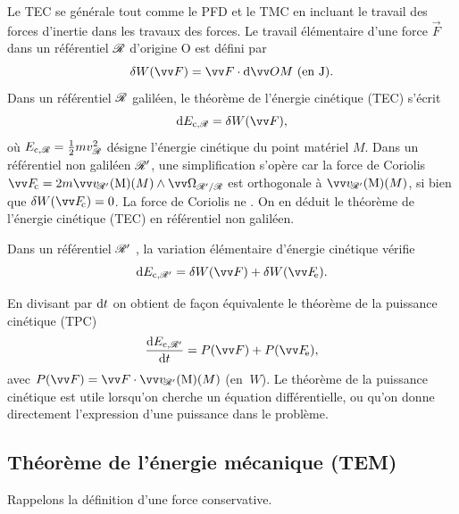 \documentclass[12pt,fancy]{cours}
\begin{document}
Le TEC se générale tout comme le PFD et le TMC en incluant le travail des forces d'inertie dans les travaux des forces. Le travail élémentaire d'une force $\Vec{F}$ dans un référentiel $\mathcal{R}$ d'origine O est défini par
\begin{equation}
  \delta W(\F) = \F \cdot \d \Vec{OM}~\text{(en J)}.
\end{equation}
Dans un référentiel $\mathcal{R}$ galiléen, le théorème de l'énergie cinétique (TEC) s'écrit
\begin{equation}
  \d E_{\rm c, \Rcal} = \delta W(\F),
\end{equation}
où $E_{\rm c, \mathcal{R}} = \frac{1}{2} m v_{\mathcal{R}}^2$ désigne l'énergie cinétique du point matériel $M$. Dans un référentiel non galiléen $\mathcal{R}'$, une simplification s'opère car la force de Coriolis $\Fc = 2m \vRp(M) \pv \OR$ est orthogonale à $\vRp(M)$, si bien que
$\delta W(\Fc) = 0$.
La force de Coriolis ne . On en déduit le théorème de l'énergie cinétique (TEC) en référentiel non galiléen.
\begin{theorem}\label{form:TEC}
Dans un référentiel $\mathcal{R}'$ , la variation élémentaire d'énergie cinétique
vérifie
\begin{equation*}
\d E_{\rm c, \Rcal'} = \delta W(\F)+\delta W(\Fe).
\end{equation*}
\end{theorem}

  En divisant par $\mathrm{d} t$ on obtient de façon équivalente le théorème de la puissance cinétique (TPC)
\begin{equation}
 \frac{\d E_{\rm{c},\Rcal'}}{\d t}=P(\F)+P(\Fe),
\end{equation}
avec $P(\F) = \F \cdot \vRp(M)$ (en $\SI{}{W}$).
Le théorème de la puissance cinétique est utile lorsqu'on cherche un équation différentielle, ou qu'on donne directement l'expression d'une puissance dans le problème.

 \subsection{Théorème de l'énergie mécanique (TEM)}
 \label{sec:raisonnement_energetique_pour_theta_eq}

 Rappelons la définition d'une force conservative.
\end{document}
